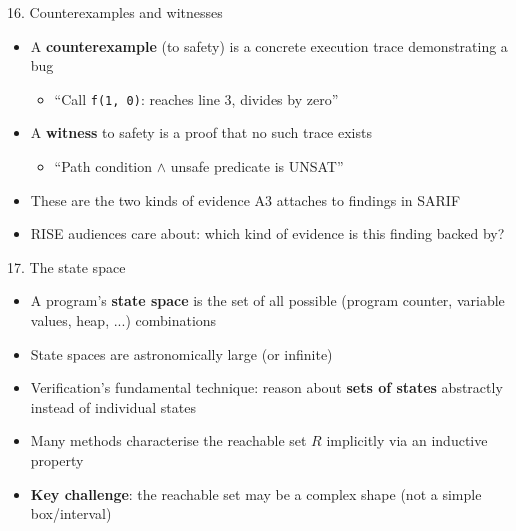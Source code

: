 \documentclass[aspectratio=169]{beamer}
\begin{document}
\begin{frame}{16. Counterexamples and witnesses}
\begin{itemize}
  \item A \textbf{counterexample} (to safety) is a concrete execution trace demonstrating a bug
    \begin{itemize}
      \item ``Call \texttt{f(1, 0)}: reaches line 3, divides by zero''
    \end{itemize}
  \item A \textbf{witness} to safety is a proof that no such trace exists
    \begin{itemize}
      \item ``Path condition \(\wedge\) unsafe predicate is UNSAT''
    \end{itemize}
  \item These are the two kinds of evidence A3 attaches to findings in SARIF
  \item RISE audiences care about: which kind of evidence is this finding backed by?
\end{itemize}
\end{frame}

\begin{frame}{17. The state space}
\begin{itemize}
  \item A program's \textbf{state space} is the set of all possible (program counter, variable values, heap, ...) combinations
  \item State spaces are astronomically large (or infinite)
  \item Verification's fundamental technique: reason about \textbf{sets of states} abstractly instead of individual states
  \item Many methods characterise the reachable set \(R\) implicitly via an inductive property
  \item \textbf{Key challenge}: the reachable set may be a complex shape (not a simple box/interval)
\end{itemize}
\end{frame}
\end{document}
